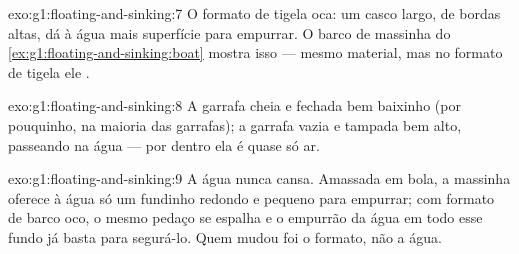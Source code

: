 \begin{solution}{exo:g1:floating-and-sinking:7}
O formato de tigela oca: um casco largo, de bordas altas, dá à água
mais superfície para empurrar. O barco de massinha do
\cref{ex:g1:floating-and-sinking:boat} mostra isso --- mesmo
material, mas no formato de tigela ele .
\end{solution}

\begin{solution}{exo:g1:floating-and-sinking:8}
A garrafa cheia e fechada  bem baixinho (por pouquinho, na
maioria das garrafas); a garrafa vazia e tampada  bem alto,
passeando na água --- por dentro ela é quase só ar.
\end{solution}

\begin{solution}{exo:g1:floating-and-sinking:9}
A água nunca cansa. Amassada em bola, a massinha oferece à água só um
fundinho redondo e pequeno para empurrar; com formato de barco oco, o
mesmo pedaço se espalha e o empurrão da água em todo esse fundo já
basta para segurá-lo. Quem mudou foi o formato, não a água.
\end{solution}
